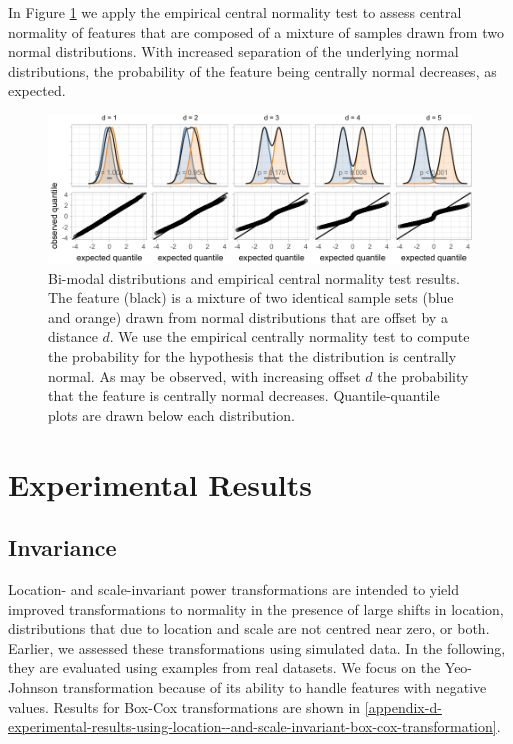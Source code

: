 \documentclass[preprint,12pt,authoryear]{elsarticle}
\begin{document}
In Figure \ref{fig:empirical-central-normality-examples} we apply the
empirical central normality test to assess central normality of features
that are composed of a mixture of samples drawn from two normal
distributions. With increased separation of the underlying normal
distributions, the probability of the feature being centrally normal
decreases, as expected.

\begin{figure}

{\centering \includegraphics[width=1\linewidth]{figure_7} 

}

\caption{Bi-modal distributions and empirical central normality test results. The feature (black) is a mixture of two identical sample sets (blue and orange) drawn from normal distributions that are offset by a distance $d$. We use the empirical centrally normality test to compute the probability for the hypothesis that the distribution is centrally normal. As may be observed, with increasing offset $d$ the probability that the feature is centrally normal decreases. Quantile-quantile plots are drawn below each distribution.}\label{fig:empirical-central-normality-examples}
\end{figure}

\section{Experimental Results}\label{experimental-results}

\subsection{Invariance}\label{sec:invariance}

Location- and scale-invariant power transformations are intended to
yield improved transformations to normality in the presence of large
shifts in location, distributions that due to location and scale are not
centred near zero, or both. Earlier, we assessed these transformations
using simulated data. In the following, they are evaluated using
examples from real datasets. We focus on the Yeo-Johnson transformation
because of its ability to handle features with negative values. Results
for Box-Cox transformations are shown in 
\ref{appendix-d-experimental-results-using-location--and-scale-invariant-box-cox-transformation}.
\end{document}

